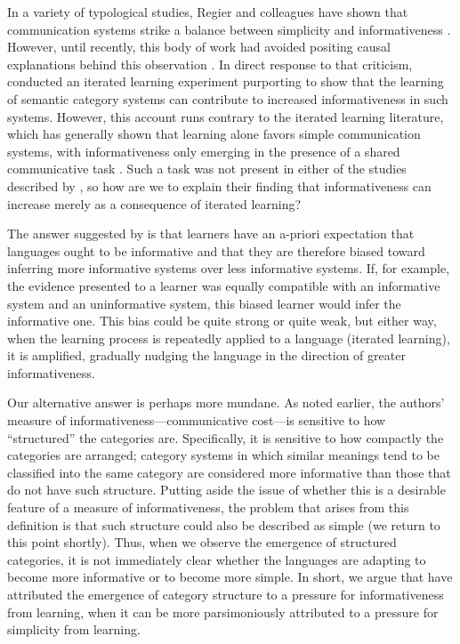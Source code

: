 \documentclass[doc,biblatex]{apa7}
\begin{document}
In a variety of typological studies, Regier and colleagues have shown that communication systems strike a balance between simplicity and informativeness \parencite[e.g.,][]{KempRegier:2012,Khetarpal:2013,Xu:2014,Regier:2015,Xu:2016,Zaslavsky:2019}. However, until recently, this body of work had avoided positing causal explanations behind this observation \parencite[p.~989]{Levinson:2012}. In direct response to that criticism, \textcite{Carstensen:2015} conducted an iterated learning experiment purporting to show that the learning of semantic category systems can contribute to increased informativeness in such systems. However, this account runs contrary to the iterated learning literature, which has generally shown that learning alone favors simple communication systems, with informativeness only emerging in the presence of a shared communicative task \parencite[e.g.,][]{Kirby:2015}. Such a task was not present in either of the studies described by \textcite{Carstensen:2015}, so how are we to explain their finding that informativeness can increase merely as a consequence of iterated learning?

The answer suggested by \textcite{Carstensen:2015} is that learners have an a-priori expectation that languages ought to be informative and that they are therefore biased toward inferring more informative systems over less informative systems. If, for example, the evidence presented to a learner was equally compatible with an informative system and an uninformative system, this biased learner would infer the informative one. This bias could be quite strong or quite weak, but either way, when the learning process is repeatedly applied to a language (iterated learning), it is amplified, gradually nudging the language in the direction of greater informativeness.

Our alternative answer is perhaps more mundane. As noted earlier, the authors' measure of informativeness---communicative cost---is sensitive to how ``structured'' the categories are. Specifically, it is sensitive to how compactly the categories are arranged; category systems in which similar meanings tend to be classified into the same category are considered more informative than those that do not have such structure. Putting aside the issue of whether this is a desirable feature of a measure of informativeness, the problem that arises from this definition is that such structure could also be described as simple (we return to this point shortly). Thus, when we observe the emergence of structured categories, it is not immediately clear whether the languages are adapting to become more informative or to become more simple. In short, we argue that \textcite{Carstensen:2015} have attributed the emergence of category structure to a pressure for informativeness from learning, when it can be more parsimoniously attributed to a pressure for simplicity from learning.
\end{document}
